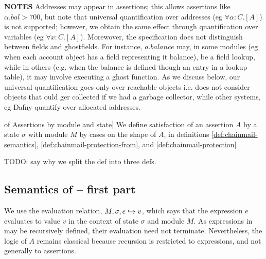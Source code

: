 \noindent
\textbf{NOTES}  Addresses may appear in assertions; this allows  assertions like $\alpha.bal > 700$, but note that universal quantification over addresses  (eg $\forall \alpha:C.[A]$) is not supported; however, we obtain the same effect through quantification over variables (eg  $\forall x:C.[A]$).  
Morewover, the specification does not distinguish between fields and ghostfields. For instance, $a.balance$ may, in some modules (eg when each account object has a field representing it balance), be a field lookup, while in others (e.g. when the balance is defined though an entry in a lookup table),  it may involve executing a ghost function. 
As we discuss below,  our universal quantification goes only over reachable objects i.e. does not consider objects that ould ger collected if we had a garbage collector, while other systems, eg Dafny quantify over allocated addresses.

\begin{definition} 
\label{def:chainmail-semantics-all}
of Assertions by module and  state] 
\label{def:chainmail-semantics}
We define satisfaction of an assertion $A$ by a %
state $\sigma$ with 
 module $M$ by cases on the shape of $A$, in definitions \ref{def:chainmail-semantics}, \ref{def:chainmail-protection-from}, and 
 \ref{def:chainmail-protection}
\end{definition}

TODO: say why we split the def into three defs. 

\subsection{Semantics of \AssertLang -- first part}
\label{sect:semantics:assert:standard}

We   use the evaluation relation, $M, \sigma, e \hookrightarrow v$,
which says that the expression $e$ evaluates
to value $v$ in the context of state $\sigma$ and module $M$.
As expressions in \LangOO may be recursively defined, their evaluation 
need not   %
 terminate. Nevertheless, the logic of $A$ remains classical because recursion is restricted
to expressions, and not generally to assertions.


